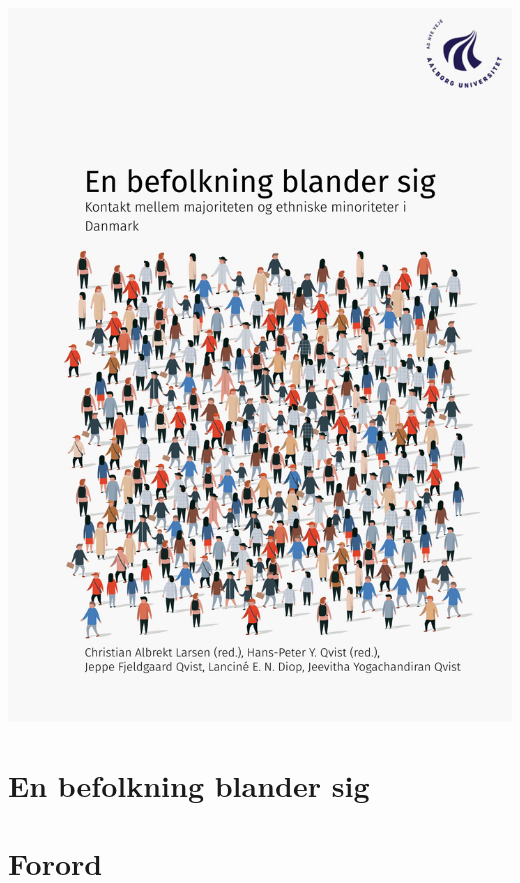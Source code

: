 \documentclass[
]{book}
\author{}
\date{\vspace{-2.5em}}
\begin{document}
\thispagestyle{empty}
\vspace*{-\topskip}
\includegraphics[width=\paperwidth,height=\paperheight]{images/00-forside.pdf} %
\restoregeometry
\clearpage

\pagestyle{empty}

\chapter*{\texorpdfstring{\color{white} En befolkning blander sig}{ En befolkning blander sig}}\label{en-befolkning-blander-sig}

\chapter*{Forord}\label{forord}
\end{document}
